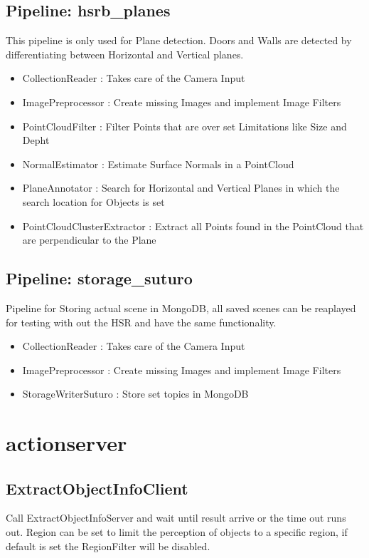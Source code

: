\documentclass[main.tex]{subfiles}
\begin{document}
			\subsection{Pipeline: hsrb\_planes} 
This pipeline is only used for Plane detection. Doors and Walls are detected by differentiating between Horizontal and Vertical planes.
\begin{itemize}
	\item CollectionReader : Takes care of the Camera  Input
	\item ImagePreprocessor : Create missing Images and implement Image Filters 
	\item PointCloudFilter : Filter Points that are over set Limitations like Size and Depht
	\item NormalEstimator : Estimate Surface Normals in a PointCloud 
	\item PlaneAnnotator : Search for Horizontal and Vertical Planes in which the search location for Objects is set
	\item PointCloudClusterExtractor : Extract all Points found in the PointCloud that are perpendicular to the Plane 
\end{itemize}

			\subsection{Pipeline: storage\_suturo} 
Pipeline for Storing actual scene in MongoDB, all saved scenes can be reaplayed for testing with out the HSR and have the same functionality. 
\begin{itemize}
	\item CollectionReader : Takes care of the Camera  Input
	\item ImagePreprocessor : Create missing Images and implement Image Filters 
	\item StorageWriterSuturo :  Store set topics in MongoDB
\end{itemize}

		\section{actionserver}

			\subsection{ExtractObjectInfoClient}
Call ExtractObjectInfoServer and wait until result arrive or the time out runs out. Region can be set to limit the perception of objects to a specific region, if default is set the RegionFilter will be disabled. 
\end{document}
